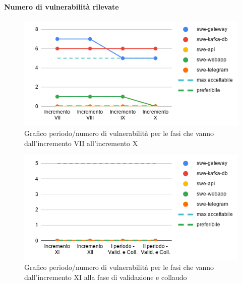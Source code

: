 \paragraph{Numero di vulnerabilità rilevate}
	\begin{figure}[H]
			\centering
			\includegraphics[width=0.8\linewidth]{./res/images/QM-PROD-4-NVUL.png}
			\caption{Grafico periodo/numero di vulnerabilità per le fasi che vanno dall'incremento VII all'incremento X}
			\label{fig:Grafico periodo/numero di vulnerabilità per le fasi che vanno dall'incremento VII all'incremento X}
	\end{figure}
	\begin{figure}[H]
			\centering
			\includegraphics[width=0.8\linewidth]{./res/images/QM-PROD-4-NVUL_1.png}
			\caption{Grafico periodo/numero di vulnerabilità per le fasi che vanno dall'incremento XI alla fase di validazione e collaudo}
			\label{fig:Grafico periodo/numero di vulnerabilità per le fasi che vanno dall'incremento XI alla fase di validazione e collaudo}
	\end{figure}

